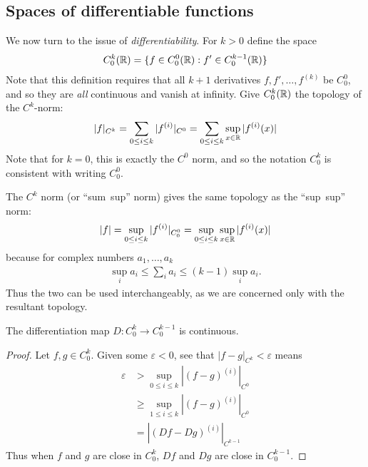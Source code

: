     \subsection{Spaces of differentiable functions}
      We now turn to the issue of \emph{differentiability}.
      For $k>0$ define the space 
      \begin{align*}
        C^k_0(\mathbb{R}) = \{f\in C^0_0(\mathbb{R}) : f'\in C^{k-1}_0(\mathbb{R})\}
      \end{align*}
      Note that this definition requires that all $k+1$ derivatives $f,f',\ldots,f^{(k)}$ be $C^0_0$, and so they are \emph{all} continuous and vanish at infinity.
      Give $C^k_0(\mathbb{R})$ the topology of the $C^k$-norm:
      \begin{align*}
        |f|_{C^k} = \sum_{0\le i\le k} |f^{(i)}|_{C^0} = \sum_{0\le i\le k} \sup_{x\in\mathbb{R}}|f^{(i)}(x)|
      \end{align*}
      Note that for $k=0$, this is exactly the $C^0$ norm, and so the notation $C^k_0$ is consistent with writing $C^0_0$.
      \begin{rmk}
        The $C^k$ norm (or ``sum~sup'' norm) gives the same topology as the ``sup~sup'' norm:
        \begin{align*}
          |f|=\sup_{0\le i\le k}|f^{(i)}|_{C^0_0}=\sup_{0\le i\le k}\sup_{x\in\mathbb{R}}|f^{(i)}(x)|
        \end{align*}
        because for complex numbers $a_1,\ldots,a_k$
        \begin{align*}
          \sup_i a_i \le \sum_i a_i \le (k-1) \sup_i a_i\text{.}
        \end{align*}
        Thus the two can be used interchangeably, as we are concerned only with the resultant topology.
      \end{rmk}
      \begin{claim}
        The differentiation map $D:C^k_0\rightarrow C^{k-1}_0$ is continuous.
        \begin{proof}
          Let $f,g\in C^k_0$.
          Given some $\varepsilon<0$, see that $|f-g|_{C^k} < \varepsilon$ means
          \begin{align*}
            \varepsilon &> \sup_{0\le i\le k} |(f-g)^{(i)}|_{C^0}\\
            &\ge \sup_{1\le i\le k} |(f-g)^{(i)}|_{C^0}\\
            &= |(Df-Dg)^{(i)}|_{C^{k-1}}
          \end{align*}
          Thus when $f$ and $g$ are close in $C^k_0$, $Df$ and $Dg$ are close in $C^{k-1}_0$.
        \end{proof}
      \end{claim}
